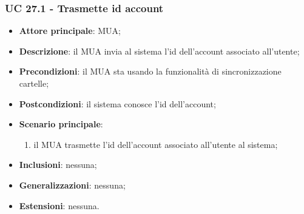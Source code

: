     \subsubsection{UC 27.1 - Trasmette id account} \label{sec:UC27.1}
    \begin{itemize}
        \item \textbf{Attore principale}: MUA;
        \item \textbf{Descrizione}: il MUA invia al sistema l'id dell'account associato all'utente;
        \item \textbf{Precondizioni}: il MUA sta usando la funzionalità di sincronizzazione cartelle;
        \item \textbf{Postcondizioni}: il sistema conosce l'id dell'account;
        \item \textbf{Scenario principale}:
            \begin{enumerate}
                \item il MUA trasmette l'id dell'account associato all'utente al sistema;
            \end{enumerate}
        \item \textbf{Inclusioni}: nessuna;
        \item \textbf{Generalizzazioni}: nessuna;
        \item \textbf{Estensioni}: nessuna.
    \end{itemize}

